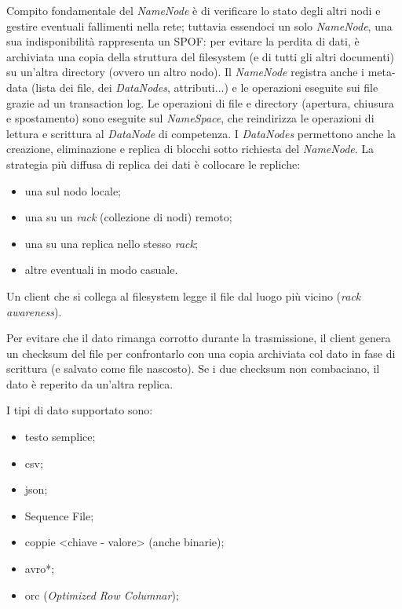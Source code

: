 \documentclass[a4page, 11pt]{article}
\begin{document}
Compito fondamentale del \textit{NameNode} è di verificare lo stato degli altri nodi e gestire eventuali fallimenti nella rete; tuttavia essendoci un solo \textit{NameNode}, una sua indisponibilità rappresenta un SPOF: per evitare la perdita di dati, è archiviata una copia della struttura del filesystem (e di tutti gli altri documenti) su un'altra directory (ovvero un altro nodo).
Il \textit{NameNode} registra anche i meta-data (lista dei file, dei \textit{DataNodes}, attributi...) e le operazioni eseguite sui file grazie ad un transaction log.
Le operazioni di file e directory (apertura, chiusura e spostamento) sono eseguite sul \textit{NameSpace}, che reindirizza le operazioni di lettura e scrittura al \textit{DataNode} di competenza.
I \textit{DataNodes} permettono anche la creazione, eliminazione e replica di blocchi sotto richiesta del \textit{NameNode}.
La strategia più diffusa di replica dei dati è collocare le repliche:
\begin{itemize}
\item una sul nodo locale;
\item una su un \textit{rack} (collezione di nodi) remoto;
\item una su una replica nello stesso \textit{rack};
\item altre eventuali in modo casuale.
\end{itemize}
Un client che si collega al filesystem legge il file dal luogo più vicino (\textit{rack awareness}).

Per evitare che il dato rimanga corrotto durante la trasmissione, il client genera un checksum del file per confrontarlo con una copia archiviata col dato in fase di scrittura (e salvato come file nascosto).
Se i due checksum non combaciano, il dato è reperito da un'altra replica.

I tipi di dato supportato sono:
\begin{itemize}
\item testo semplice;
\item csv;
\item json;
\item Sequence File;
\item coppie \textless{}chiave - valore\textgreater{} (anche binarie);
\item avro*;
\item orc (\textit{Optimized Row Columnar});
\end{itemize}
\end{document}

